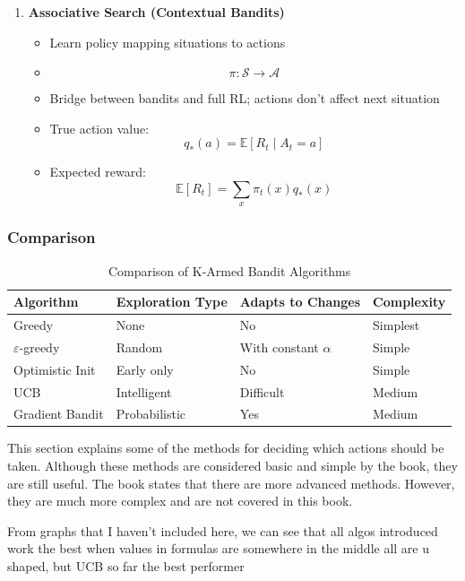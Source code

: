 \begin{enumerate}
\item \textbf{Associative Search (Contextual Bandits)}
\begin{itemize}
\item Learn policy mapping situations to actions
\item $$\pi: \mathcal{S} \to \mathcal{A}$$
\item Bridge between bandits and full RL; actions don't affect next situation
\item True action value: 
$$q_*(a) = \mathbb{E}[R_t \mid A_t = a]$$
\item Expected reward: 
$$\mathbb{E}[R_t] = \sum_x \pi_t(x) q_*(x)$$
\end{itemize}

\end{enumerate}

\subsubsection{Comparison}


\begin{table}[H]
\centering
\caption{Comparison of K-Armed Bandit Algorithms}
\begin{tabular}{|l|l|l|l|}
\hline
\textbf{Algorithm} & \textbf{Exploration Type} & \textbf{Adapts to Changes} & \textbf{Complexity} \\ \hline
Greedy & None & No & Simplest \\ \hline
$\varepsilon$-greedy & Random & With constant $\alpha$ & Simple \\ \hline
Optimistic Init & Early only & No & Simple \\ \hline
UCB & Intelligent & Difficult & Medium \\ \hline
Gradient Bandit & Probabilistic & Yes & Medium \\ \hline
\end{tabular}
\end{table}

This section explains some of the methods for deciding which actions should be taken. Although these methods are considered basic and simple by the book, they are still useful. The book states that there are more advanced methods. However, they are much more complex and are not covered in this book. 

From graphs that I haven't included here, we can see that all algos introduced work the best when values in formulas are somewhere in the middle all are u shaped, but UCB so far the best performer

